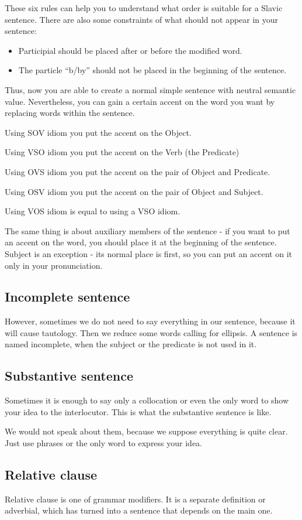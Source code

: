 These six rules can help you to understand what order is suitable for a Slavic sentence. There are also some constraints of what should not appear in your sentence:

\begin{itemize}
	\item Participial should be placed after or before the modified word.
	\item The particle “b/by” should not be placed in the beginning of the sentence.
\end{itemize}

Thus, now you are able to create a normal simple sentence with neutral semantic value. Nevertheless, you can gain a certain accent on the word you want by replacing words within the sentence.

Using SOV idiom you put the accent on the Object. 

Using VSO idiom you put the accent on the Verb (the Predicate)

Using OVS idiom you put the accent on the pair of Object and Predicate.

Using OSV idiom you put the accent on the pair of Object and Subject.

Using VOS idiom is equal to using a VSO idiom.

The same thing is about auxiliary members of the sentence - if you want to put an accent on the word, you should place it at the beginning of the sentence. Subject is an exception - its normal place is first, so you can put an accent on it only in your pronunciation.

\subsection{Incomplete sentence}

However, sometimes we do not need to say everything in our sentence, because it will cause tautology. Then we reduce some words calling for ellipsis. A sentence is named incomplete, when the subject or the predicate is not used in it.

\subsection{Substantive sentence}

Sometimes it is enough to say only a collocation or even the only word to show your idea to the interlocutor. This is what the substantive sentence is like.

We would not speak about them, because we suppose everything is quite clear. Just use phrases or the only word to express your idea.

\subsection{Relative clause}

Relative clause is one of grammar modifiers. It is a separate definition or adverbial, which has turned into a sentence that depends on the main one.
